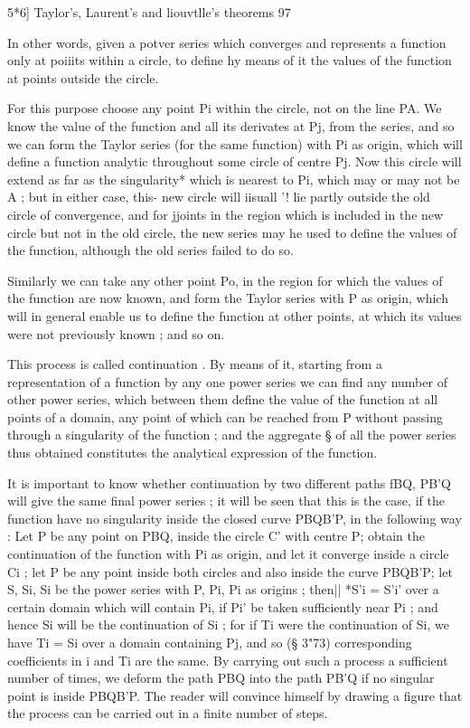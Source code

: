 {{5*6] Taylor's, Laurent's and liouvtlle's theorems 97 

In other words, given a potver series which converges and represents a 
function only at poiiits within a circle, to define hy means of it the values 
of the function at points outside the circle. 

For this purpose choose any point Pi within the circle, not on the line 
PA. We know the value of the function and all its derivates at Pj, from 
the series, and so we can form the Taylor series (for the same function) 
with Pi as origin, which will define a function analytic throughout some 
circle of centre Pj. Now this circle will extend as far as the singularity* 
which is nearest to Pi, which may or may not be A ; but in either case, this- 
new circle will iisuall '! lie partly outside the old circle of convergence, and 
for jjoints in the region which is included in the new circle but not in the old 
circle, the new series may he used to define the values of the function, although 
the old series failed to do so. 

Similarly we can take any other point Po, in the region for which the 
values of the function are now known, and form the Taylor series with P  
as origin, which will in general enable us to define the function at other 
points, at which its values were not previously known ; and so on. 

This process is called continuation . By means of it, starting from a 
representation of a function by any one power series we can find any number 
of other power series, which between them define the value of the function 
at all points of a domain, any point of which can be reached from P without 
passing through a singularity of the function ; and the aggregate § of all 
the power series thus obtained constitutes the analytical expression of the 
function. 

It is important to know whether continuation by two different paths fBQ, PB'Q will 
give the same final power series ; it will be seen that this is the case, if the function 
have no singularity inside the closed curve PBQB'P, in the following way : Let P  be any 
point on PBQ, inside the circle C' with centre P; obtain the continuation of the function 
with Pi as origin, and let it converge inside a circle Ci ; let P  be any point inside both 
circles and also inside the curve PBQB'P; let S, Si, Si be the power series with P, Pi, 
Pi as origins ; then|| *S'i =  S'i' over a certain domain which will contain Pi, if Pi' be taken 
sufficiently near Pi ; and hence Si will be the continuation of Si ; for if Ti were the 
continuation of Si, we have Ti = Si over a domain containing Pj, and so (§ 3"73) 
corresponding coefficients in  i and Ti are the same. By carrying out such a process a 
sufficient number of times, we deform the path PBQ into the path PB'Q if no singular 
point is inside PBQB'P. The reader will convince himself by drawing a figure that 
the process can be carried out in a finite number of steps. 

}}
